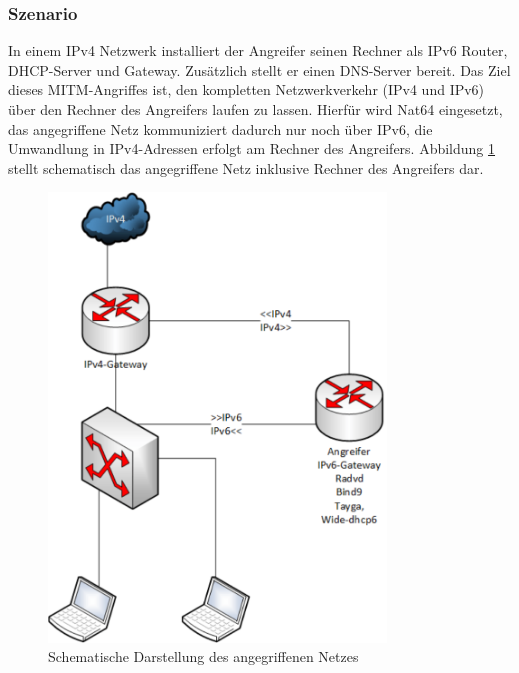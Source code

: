 \subsubsection*{Szenario}
In einem IPv4 Netzwerk installiert der Angreifer seinen Rechner als IPv6 Router, DHCP-Server und Gateway. Zusätzlich stellt er einen DNS-Server bereit. Das Ziel dieses MITM-Angriffes ist, den kompletten Netzwerkverkehr (IPv4 und IPv6) über den Rechner des Angreifers laufen zu lassen. Hierfür wird Nat64 eingesetzt, das angegriffene Netz kommuniziert dadurch nur noch über IPv6, die Umwandlung in IPv4-Adressen erfolgt am Rechner des Angreifers. Abbildung \ref{fig:fakeIpv6_szenario} stellt schematisch das angegriffene Netz inklusive Rechner des Angreifers dar.
\begin{figure}[h!]
	\centering
	\includegraphics[width=0.8\textwidth]{bilder/fakeIPv6/fakeIpv6_szenario.pdf}
	\caption{Schematische Darstellung des angegriffenen Netzes}
	\label{fig:fakeIpv6_szenario}
\end{figure}

